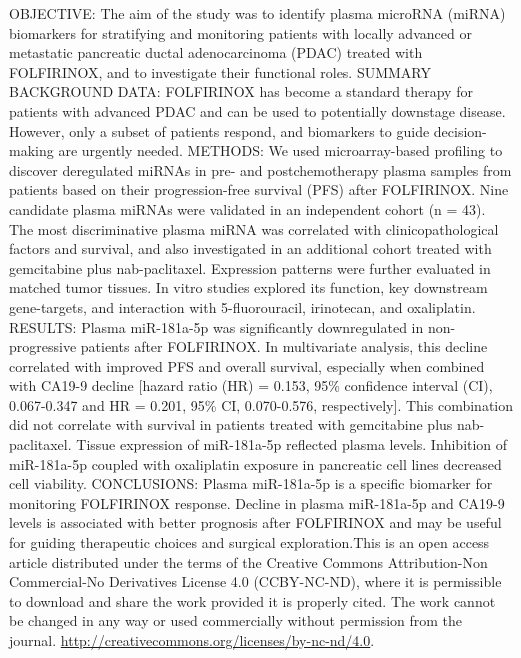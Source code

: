 \documentclass[]{article}
\begin{document}
OBJECTIVE: The aim of the study was to identify plasma microRNA (miRNA)
biomarkers for stratifying and monitoring patients with locally advanced
or metastatic pancreatic ductal adenocarcinoma (PDAC) treated with
FOLFIRINOX, and to investigate their functional roles. SUMMARY
BACKGROUND DATA: FOLFIRINOX has become a standard therapy for patients
with advanced PDAC and can be used to potentially downstage disease.
However, only a subset of patients respond, and biomarkers to guide
decision-making are urgently needed. METHODS: We used microarray-based
profiling to discover deregulated miRNAs in pre- and postchemotherapy
plasma samples from patients based on their progression-free survival
(PFS) after FOLFIRINOX. Nine candidate plasma miRNAs were validated in
an independent cohort (n = 43). The most discriminative plasma miRNA was
correlated with clinicopathological factors and survival, and also
investigated in an additional cohort treated with gemcitabine plus
nab-paclitaxel. Expression patterns were further evaluated in matched
tumor tissues. In vitro studies explored its function, key downstream
gene-targets, and interaction with 5-fluorouracil, irinotecan, and
oxaliplatin. RESULTS: Plasma miR-181a-5p was significantly downregulated
in non-progressive patients after FOLFIRINOX. In multivariate analysis,
this decline correlated with improved PFS and overall survival,
especially when combined with CA19-9 decline {[}hazard ratio (HR) =
0.153, 95\% confidence interval (CI), 0.067-0.347 and HR = 0.201, 95\%
CI, 0.070-0.576, respectively{]}. This combination did not correlate
with survival in patients treated with gemcitabine plus nab-paclitaxel.
Tissue expression of miR-181a-5p reflected plasma levels. Inhibition of
miR-181a-5p coupled with oxaliplatin exposure in pancreatic cell lines
decreased cell viability. CONCLUSIONS: Plasma miR-181a-5p is a specific
biomarker for monitoring FOLFIRINOX response. Decline in plasma
miR-181a-5p and CA19-9 levels is associated with better prognosis after
FOLFIRINOX and may be useful for guiding therapeutic choices and
surgical exploration.This is an open access article distributed under
the terms of the Creative Commons Attribution-Non Commercial-No
Derivatives License 4.0 (CCBY-NC-ND), where it is permissible to
download and share the work provided it is properly cited. The work
cannot be changed in any way or used commercially without permission
from the journal.
\url{http://creativecommons.org/licenses/by-nc-nd/4.0}.

{}

{}
\end{document}
